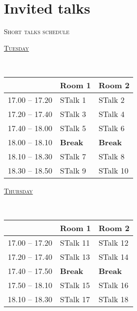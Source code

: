 \documentclass[a4paper]{article}
\begin{document}
\section{Invited talks}

\pagebreak
\thispagestyle{empty}
	\begin{center}
	\textsc{\LARGE Short talks schedule}\\
	\vspace{0.5cm}
	\end{center}	
	\begin{center}
	\hypertarget{short1}{\textsc{\Large\hyperlink{bS1}{Tuesday }}}\\ %
	\end{center}
	\begin{table}[htbp]
		\centering
		\begin{tabularx}{\textwidth}{| c | X | X |}
			\hline
	     & \textbf{Room 1}     & \textbf{Room 2}\\ \hline
17.00 -- 17.20    & {STalk 1} & {STalk 2}  \\ \hline
17.20 -- 17.40     & {STalk 3} & {STalk 4} \\ \hline
17.40 -- 18.00 &  {STalk 5} & {STalk 6} \\ \hline
18.00 -- 18.10 & \textbf{Break} & \textbf{Break} \\ \hline
18.10 -- 18.30 & {STalk 7} & {STalk 8} \\ \hline
18.30 -- 18.50 & {STalk 9} & {STalk 10}  \\ \hline
		\end{tabularx}
		\end{table}
		\begin{center}
			\hypertarget{short2}{\textsc{\Large\hyperlink{bS2}{Thursday}}}\\ %
		\end{center}
		\begin{table}[htbp]
		\centering
		\begin{tabularx}{\textwidth}{| c | X | X |}
			\hline
	     & \textbf{Room 1}     & \textbf{Room 2} \\ \hline
17.00 -- 17.20    & {STalk 11} & {STalk 12}  \\ \hline
17.20 -- 17.40     & {STalk 13}  & {STalk 14} \\ \hline
17.40 -- 17.50 & \textbf{Break} & \textbf{Break} \\ \hline
17.50 -- 18.10 &  {STalk 15}& {STalk 16}  \\ \hline
18.10 -- 18.30 & {STalk 17}  & {STalk 18}  \\ \hline
		\end{tabularx}
		
	\end{table}
\end{document}
